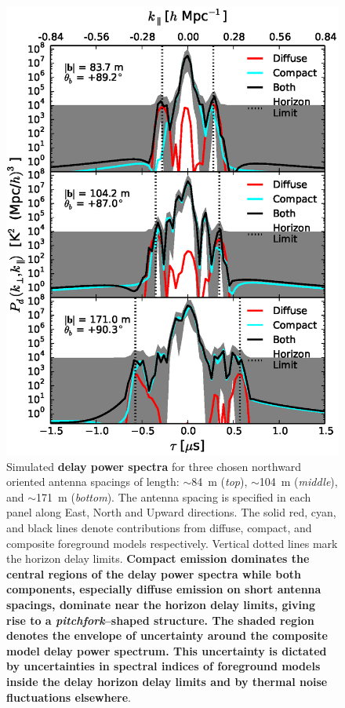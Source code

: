 \documentclass[preprint2,iop,numberedappendix]{emulateapj}
\begin{document}
\begin{figure}[htb]
\centering
\includegraphics[width=\linewidth]{fig10.eps}
\caption{Simulated {\bf delay power spectra} for three chosen northward oriented antenna spacings of length: $\sim$84~m ({\it top}), $\sim$104~m ({\it middle}), and $\sim$171~m ({\it bottom}). The antenna spacing is specified in each panel along East, North and Upward directions. The solid red, cyan, and black lines denote contributions from diffuse, compact, and composite foreground models respectively. Vertical dotted lines mark the horizon delay limits. {\bf Compact emission dominates the central regions of the delay power spectra while both components, especially diffuse emission on short antenna spacings, dominate near the horizon delay limits, giving rise to a {\it pitchfork}--shaped structure. The shaded region denotes the envelope of uncertainty around the composite model delay power spectrum. This uncertainty is dictated by uncertainties in spectral indices of foreground models inside the delay horizon delay limits and by thermal noise fluctuations elsewhere}. \label{fig:pitchfork-baselines}}
\end{figure}
\end{document}
